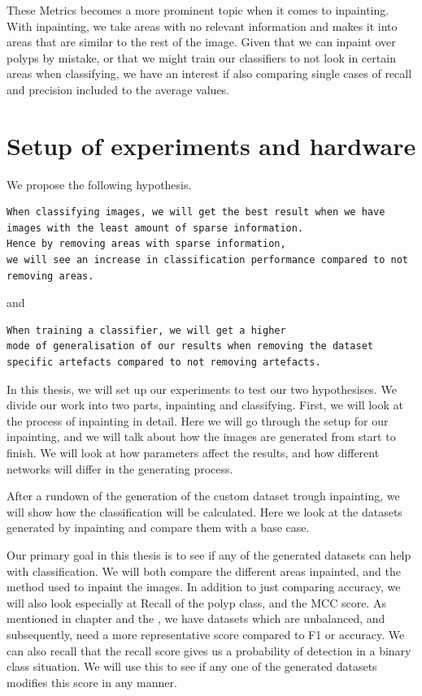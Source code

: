 These Metrics becomes a more prominent topic when it comes to inpainting. With inpainting, we take areas with no relevant information and makes it into areas that are similar to the rest of the image. Given that we can inpaint over polyps by mistake, or that we might train our classifiers to not look in certain areas when classifying, we have an interest if also comparing single cases of recall and precision included to the average values.






\section{Setup of experiments and hardware}
We propose the following hypothesis.
\vspace{10px}

\begin{verbatim}
When classifying images, we will get the best result when we have images with the least amount of sparse information. 
Hence by removing areas with sparse information,
we will see an increase in classification performance compared to not removing areas.
\end{verbatim}

and

\begin{verbatim}
When training a classifier, we will get a higher
mode of generalisation of our results when removing the dataset
specific artefacts compared to not removing artefacts.
\end{verbatim}


In this thesis, we will set up our experiments to test our two hypothesises. 
We divide our work into two parts, inpainting and classifying. 
First, we will look at the process of inpainting in detail. Here we will go through the setup for our inpainting, and we will talk about how the images are generated from start to finish. 
We will look at how parameters affect the results, and how different networks will differ in the generating process. 


After a rundown of the generation of the custom dataset trough inpainting, we will show how the classification will be calculated. Here we look at the datasets generated by inpainting and compare them with a base case. 

Our primary goal in this thesis is to see if any of the generated datasets can help with classification. We will both compare the different areas inpainted, and the method used to inpaint the images. 
In addition to just comparing accuracy, we will also look especially at Recall of the polyp class, and the MCC score. 
As mentioned in chapter  and the , we have datasets which are unbalanced, and subsequently, need a more representative score compared to F1 or accuracy. 
We can also recall that the recall score  gives us a  probability of detection in a binary class situation. We will use this to see if any one of the generated datasets modifies this score in any manner. 

